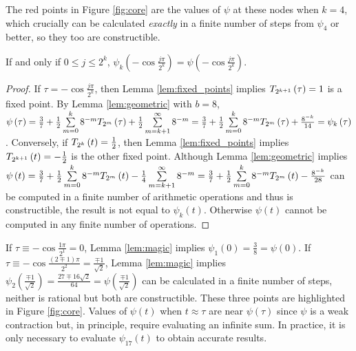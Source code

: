 The red points in Figure \ref{fig:core} are the values of $\psi$ at these nodes when $k = 4$, which crucially can be calculated \emph{exactly} in a finite number of steps from $\psi_4$ or better, so they too are constructible.

\begin{lemma}
  \label{lem:magic}
  If and only if $0 \leq j \leq 2^k$, $\psi_k\left(-\cos\frac{j\pi}{2^k}\right) = \psi\left(-\cos\frac{j\pi}{2^k}\right)$.
\end{lemma}
\begin{proof}
  If $\tau = -\cos\frac{j\pi}{2^k}$, then Lemma \ref{lem:fixed_points} implies $T_{2^{k + 1}}\left(\tau\right) = 1$ is a fixed point. By Lemma \ref{lem:geometric} with $b = 8$, $\psi\left(\tau\right) = \frac{3}{7} + \frac{1}{2} \sum\limits_{m = 0}^{k} 8^{-m} T_{2^{m}}\left(\tau\right) + \frac{1}{2}\sum\limits_{m = k + 1}^\infty 8^{-m} = \frac{3}{7} + \frac{1}{2} \sum\limits_{m = 0}^{k} 8^{-m} T_{2^{m}}\left(\tau\right) + \frac{8^{-k}}{14} = \psi_k\left(\tau\right)$. Conversely, if $T_{2^{k}}\left(t\right) = \frac{1}{2}$, then Lemma \ref{lem:fixed_points} implies $T_{2^{k + 1}}\left(t\right) = -\frac{1}{2}$ is the other fixed point. Although Lemma \ref{lem:geometric} implies $\psi\left(t\right) = \frac{3}{7} + \frac{1}{2} \sum\limits_{m = 0}^{k} 8^{-m} T_{2^{m}}\left(t\right) - \frac{1}{4}\sum\limits_{m = k + 1}^\infty 8^{-m} = \frac{3}{7} + \frac{1}{2} \sum\limits_{m = 0}^{k} 8^{-m} T_{2^{m}}\left(t\right) - \frac{8^{-k}}{28}$ can be computed in a finite number of arithmetic operations and thus is constructible, the result is not equal to $\psi_k\left(t\right)$. Otherwise $\psi\left(t\right)$ cannot be computed in any finite number of operations.
\end{proof}
\noindent If $\tau \equiv -\cos \frac{1\pi}{2^1} = 0$, Lemma \ref{lem:magic} implies $\psi_1\left(0\right) = \frac{3}{8} = \psi\left(0\right)$. If $\tau \equiv -\cos\frac{\left(2 \mp 1\right)\pi}{2^2} = \frac{\mp 1}{\sqrt{2}}$, Lemma \ref{lem:magic} implies $\psi_2\left(\frac{\mp 1}{\sqrt{2}}\right) = \frac{27 \mp 16 \sqrt{2}}{64} = \psi\left(\frac{\mp 1}{\sqrt{2}}\right)$ can be calculated in a finite number of steps, neither is rational but both are constructible. These three points are highlighted in Figure \ref{fig:core}. Values of $\psi\left(t\right)$ when $t \approx \tau$ are near $\psi\left(\tau\right)$ since $\psi$ is a weak contraction but, in principle, require evaluating an infinite sum. In practice, it is only necessary to evaluate $\psi_{17}\left(t\right)$ to obtain accurate results.

